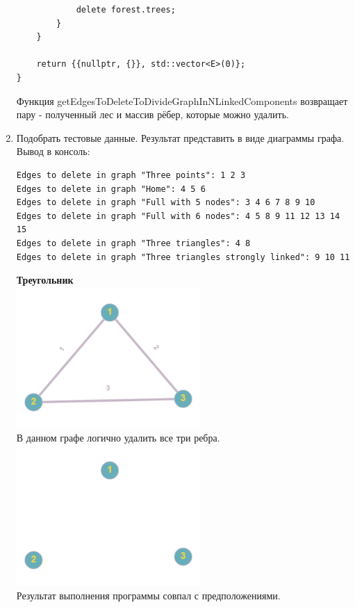 \documentclass[a4paper,14pt]{extarticle}
\begin{document}
\begin{enumerate}[1.]
\begin{verbatim}
            delete forest.trees;
        }
    }

    return {{nullptr, {}}, std::vector<E>(0)};
}
        \end{verbatim}
        Функция getEdgesToDeleteToDivideGraphInNLinkedComponents возвращает пару - полученный лес и массив рёбер, которые можно удалить.
        \item Подобрать тестовые данные. Результат представить в виде диаграммы графа.\\
        Вывод в консоль:
                    \begin{verbatim}
Edges to delete in graph "Three points": 1 2 3
Edges to delete in graph "Home": 4 5 6
Edges to delete in graph "Full with 5 nodes": 3 4 6 7 8 9 10 
Edges to delete in graph "Full with 6 nodes": 4 5 8 9 11 12 13 14 15 
Edges to delete in graph "Three triangles": 4 8
Edges to delete in graph "Three triangles strongly linked": 9 10 11 
                    \end{verbatim}
        
        \textbf{Треугольник}\\
        \includegraphics[width=70mm]{testThreeNodesBefore}\\
        В данном графе логично удалить все три ребра.\\
        \includegraphics[width=70mm]{testThreeNodesAfter}\\
        Результат выполнения программы совпал с предположениями.\\


\end{enumerate}
\end{document}
